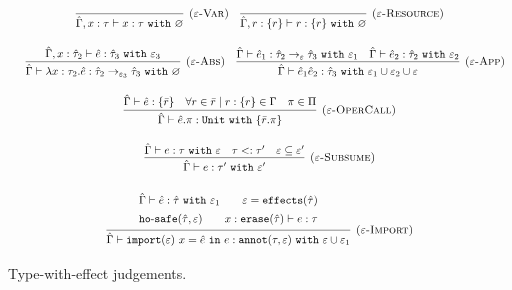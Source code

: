 \begin{figure}[h]


\noindent
{}

\[
\begin{array}{c}

\infer[\textsc{($\varepsilon$-Var)}]
	{ \hat \Gamma, x:\tau \vdash x: \tau~\kw{with} \varnothing }
	{}
	
	~~~
	
\infer[\textsc{($\varepsilon$-Resource)}]
 	{ \hat \Gamma, r: \{ r \} \vdash r : \{ r \}~\kw{with} \varnothing }
 	{} \\[3ex]
 	
 	~~~
	\infer[\textsc{($\varepsilon$-Abs)}]
	{ \hat \Gamma \vdash \lambda x:\tau_2 . \hat e : \hat \tau_2 \rightarrow_{\varepsilon_3} \hat \tau_3~\kw{with} \varnothing }
	{ \hat \Gamma, x: \hat \tau_2 \vdash \hat e: \hat \tau_3~\kw{with} \varepsilon_3 }
	
	~~~
	
\infer[\textsc{($\varepsilon$-App)}]
	{ \hat \Gamma \vdash \hat e_1 \hat e_2 : \hat \tau_3~\kw{with} \varepsilon_1 \cup \varepsilon_2 \cup \varepsilon  }
	{ \hat \Gamma \vdash \hat e_1: \hat \tau_2 \rightarrow_{\varepsilon} \hat \tau_3~\kw{with} \varepsilon_1 & \hat \Gamma \vdash \hat e_2: \hat \tau_2~\kw{with} \varepsilon_2 } \\[3ex]
	
\infer[\textsc{($\varepsilon$-OperCall)}]
	{ \hat \Gamma \vdash \hat e.\pi: \kw{Unit} \kw{with} \{ \bar r.\pi \} }
	{ \hat \Gamma \vdash \hat e: \{ \bar r \} & \forall r \in \bar r \mid r: \{ r \} \in \Gamma & \pi \in \Pi } \\[3ex]

\infer[\textsc{($\varepsilon$-Subsume)}]
	{ \hat \Gamma \vdash e: \tau' ~\kw{with} \varepsilon'}
	{ \hat \Gamma \vdash e: \tau ~\kw{with} \varepsilon & \tau <: \tau' & \varepsilon \subseteq \varepsilon'}  \\[3ex]

\infer[\textsc{($\varepsilon$-Import)}]
	{ \hat \Gamma \vdash \kwa{import}(\varepsilon)~x = \hat e~\kw{in} e: \kwa{annot}(\tau, \varepsilon)~\kw{with} \varepsilon \cup \varepsilon_1 }
{{\def\arraystretch{1.4}
  \begin{array}{c}
\hat \Gamma \vdash \hat e: \hat \tau~\kw{with} \varepsilon_1
~~~~~~
\varepsilon = \kwa{effects}(\hat \tau) \\
\kwa{ho \hyphen safe}(\hat \tau, \varepsilon) ~~~~~~ x: \kwa{erase}(\hat \tau) \vdash e: \tau
  \end{array}}} 
 
\end{array}
\]


\vspace{-7pt}
\caption{Type-with-effect judgements.}
\label{This is the label.}
\end{figure}

